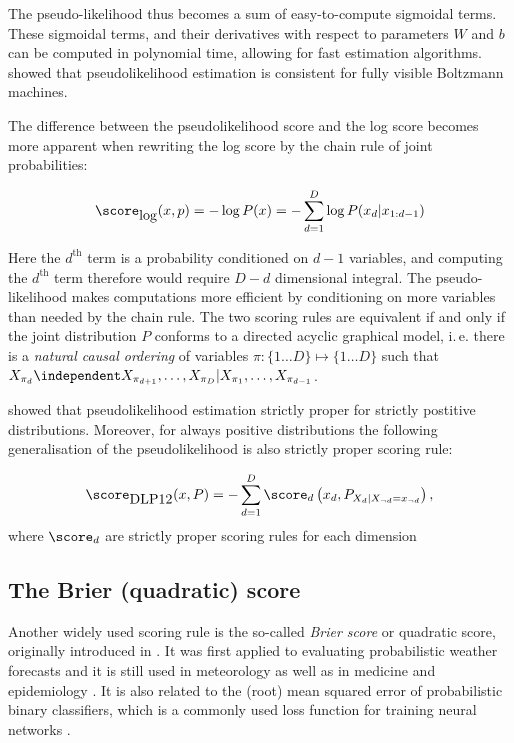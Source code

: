 The pseudo-likelihood thus becomes a sum of easy-to-compute sigmoidal terms. These sigmoidal terms, and their derivatives with respect to parameters $W$ and $b$ can be computed in polynomial time, allowing for fast estimation algorithms. \citep{Hyvarinen2006} showed that pseudolikelihood estimation is consistent for fully visible Boltzmann machines. 

The difference between the pseudolikelihood score and the log score becomes more apparent when rewriting the log score by the chain rule of joint probabilities:

\begin{equation}
	\score_{\mbox{log}}(x,p) = - \log P(x) =  - \sum_{d=1}^{D} \log P(x_d\vert x_{1:d-1})
\end{equation}

Here the $d^{\mbox{th}}$ term is a probability conditioned on $d-1$ variables, and computing the $d^{\mbox{th}}$ term therefore would require $D-d$ dimensional integral. The pseudo-likelihood makes computations more efficient by conditioning on more variables than needed by the chain rule. The two scoring rules are equivalent if and only if the joint distribution $P$ conforms to a directed acyclic graphical model, i.\,e. there is a \emph{natural causal ordering} of variables $\pi:\{1\ldots D\}\mapsto\{1\ldots D\}$ such that $X_{\pi_d}\independent X_{\pi_{d+1}},\ldots,X_{\pi_D} \vert X_{\pi_1},\ldots,X_{\pi_{d-1}}$. 

\citep{Csiszar2004} showed that pseudolikelihood estimation strictly proper for strictly postitive distributions. Moreover, for always positive distributions the following generalisation of the pseudolikelihood is also strictly proper scoring rule:

\begin{equation}
	\score_{\mbox{DLP12}}(x,P) = - \sum_{d=1}^{D} \score_d\left(x_d, P_{X_d \vert X_{\neg d}=x_{\neg d}}\right),
\end{equation}
where $\score_d$ are strictly proper scoring rules for each dimension

\subsection{The Brier (quadratic) score}

Another widely used scoring rule is the so-called \emph{Brier score} or quadratic score, originally introduced in \citep{Brier1950}. It was first applied to evaluating probabilistic weather forecasts and it is still used in meteorology \citep{Ferro2007} as well as in medicine \citep{Spiegelhalter2006} and epidemiology \citep{Redelmeier1991}. It is also related to the (root) mean squared error of probabilistic binary classifiers, which is a commonly used loss function for training neural networks \citep{Rumelhart1988}.

